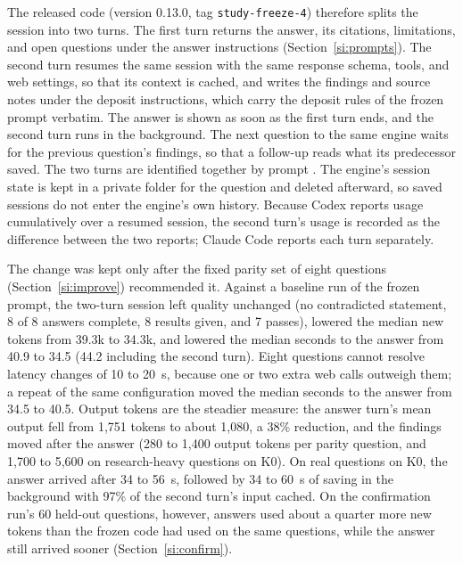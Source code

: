 \documentclass[journal=mamobx,manuscript=suppinfo]{achemso}
\newcommand{\code}[1]{\texttt{#1}}
\newcommand{\ident}[1]{\path{#1}}
\begin{document}
The released code (version 0.13.0, tag \code{study-freeze-4}) therefore splits the session into two turns.
The first turn returns the answer, its citations, limitations, and open questions under the answer instructions (Section~\ref{si:prompts}).
The second turn resumes the same session with the same response schema, tools, and web settings, so that its context is cached, and writes the findings and source notes under the deposit instructions, which carry the deposit rules of the frozen prompt verbatim.
The answer is shown as soon as the first turn ends, and the second turn runs in the background.
The next question to the same engine waits for the previous question's findings, so that a follow-up reads what its predecessor saved.
The two turns are identified together by prompt \ident{86404bf073ce}.
The engine's session state is kept in a private folder for the question and deleted afterward, so saved sessions do not enter the engine's own history.
Because Codex reports usage cumulatively over a resumed session, the second turn's usage is recorded as the difference between the two reports; Claude Code reports each turn separately.

The change was kept only after the fixed parity set of eight questions (Section~\ref{si:improve}) recommended it.
Against a baseline run of the frozen prompt, the two-turn session left quality unchanged (no contradicted statement, 8 of 8 answers complete, 8 results given, and 7 passes), lowered the median new tokens from 39.3k to 34.3k, and lowered the median seconds to the answer from 40.9 to 34.5 (44.2 including the second turn).
Eight questions cannot resolve latency changes of 10 to 20~s, because one or two extra web calls outweigh them; a repeat of the same configuration moved the median seconds to the answer from 34.5 to 40.5.
Output tokens are the steadier measure: the answer turn's mean output fell from 1,751 tokens to about 1,080, a 38\% reduction, and the findings moved after the answer (280 to 1,400 output tokens per parity question, and 1,700 to 5,600 on research-heavy questions on K0).
On real questions on K0, the answer arrived after 34 to 56~s, followed by 34 to 60~s of saving in the background with 97\% of the second turn's input cached.
On the confirmation run's 60 held-out questions, however, answers used about a quarter more new tokens than the frozen code had used on the same questions, while the answer still arrived sooner (Section~\ref{si:confirm}).

\end{document}
